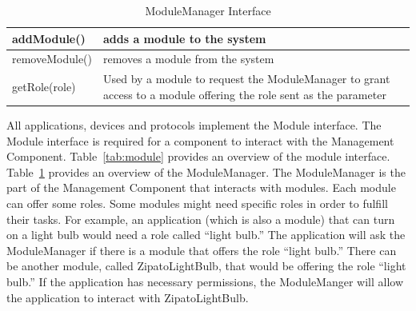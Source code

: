 \begin{table}
\begin{center}
\begin{tabular}{| p{2.5cm} | p{4.5cm} |}
\hline
addModule() & adds a module to the system \\ \hline
removeModule() & removes a module from the system \\ \hline
getRole(role) & Used by a module to request the ModuleManager to grant
access to a module offering the role sent as the parameter  \\ \hline
\end{tabular}
\end{center}
\caption{ModuleManager Interface}
\label{tab:modulemanager}
\end{table}
All applications, devices and protocols implement the Module interface. The
Module interface is required for a component to interact with the Management 
Component. Table~\ref{tab:module} provides an overview of the module interface.
Table~\ref{tab:modulemanager} provides an overview of the ModuleManager.
The ModuleManager is the part of the Management Component that interacts with
modules. Each module can offer some roles. Some modules might need specific
roles in order to fulfill their tasks. For example, an application (which is
also a module) that can turn on a light bulb would need a role called ``light
bulb.'' The application will ask the ModuleManager if there is a module that
offers the role ``light bulb.'' There can be another module, called
ZipatoLightBulb, that would be offering the role ``light bulb.'' If the
application has necessary permissions, the ModuleManger will allow the
application to interact with ZipatoLightBulb.
